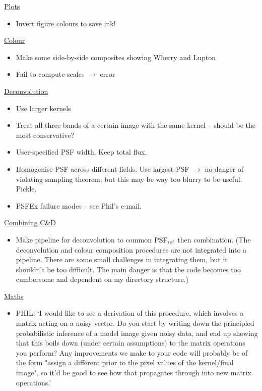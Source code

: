 \documentclass[letterpaper, 11pt]{article}
\def\psfref{\ensuremath{{\rm PSF_{ref}}}\xspace}
\def\TODO#1{ {\color{red}{\bf TODO: {#1}}}\xspace}
\begin{document}
\underline{Plots}
\begin{itemize}
	\item Invert figure colours to save ink!
\end{itemize}

\underline{Colour}
\begin{itemize}
	\item Make some side-by-side composites showing Wherry and Lupton
	\item Fail to compute scales $\rightarrow$ error
\end{itemize}

\underline{Deconvolution}
\begin{itemize}
	\item Use larger kernels
	\item Treat all three bands of a certain image with the same kernel -- should be the most conservative?
	\item User-specified PSF width. Keep total flux.
	\item Homogenise PSF across different fields. \TODO{What is the best way to do this?} Use largest PSF $\rightarrow$ no danger of violating sampling theorem; but this may be way too blurry to be useful. Pickle.
	\item PSFEx failure modes -- see Phil's e-mail.
\end{itemize}

\underline{Combining C\&D}
\begin{itemize}
	\item Make pipeline for deconvolution to common \psfref then combination. (The deconvolution and colour composition procedures are not integrated into a pipeline. There are some small challenges in integrating them, but it shouldn't be too difficult. The main danger is that the code becomes too cumbersome and dependent on my directory structure.)
\end{itemize}

\underline{Maths}
\begin{itemize}
	\item PHIL: `I would like to see a derivation of this procedure, which involves a
matrix acting on a noisy vector. Do you start by writing down the
principled probabilistic inference of a model image given noisy data,
and end up showing that this boils down (under certain assumptions) to
the matrix operations you perform? Any improvements we make to your
code will probably be of the form "assign a different prior to the
pixel values of the kernel/final image", so it'd be good to see how
that propagates through into new matrix operations.'
\end{itemize}
\end{document}
